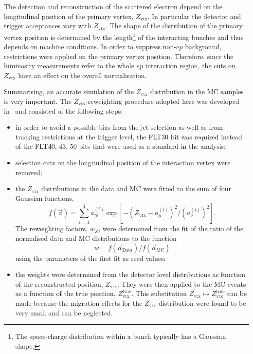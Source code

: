 The detection and reconstruction of the scattered electron depend on the longitudinal position of the primary vertex, $Z_\text{vtx}$. In particular the detector and trigger acceptances vary with $Z_\text{vtx}$. The shape of the distribution of the primary vertex position is determined by the length\footnote{The space-charge distribution within a bunch typically has a Gaussian shape.} of the interacting bunches and thus depends on machine conditions. In order to suppress non-$ep$ background, restrictions were applied on the primary vertex position. Therefore, since the luminosity measurements refer to the whole $ep$ interaction region, the cuts on $Z_\text{vtx}$ have an effect on the overall normalisation. 

Summarising, an accurate simulation of the $Z_\text{vtx}$ distribution in the MC samples is very important. The $Z_\text{vtx}$-reweighting procedure adopted here was developed in~\cite{thesis:behr:2010} and consisted of the following steps:
\begin{itemize}
 \item in order to avoid a possible bias from the jet selection as well as from tracking restrictions at the trigger level, the FLT30 bit was required instead of the FLT40, 43, 50 bits that were used as a standard in the analysis;
 \item selection cuts on the longitudinal position of the interaction vertex were removed;
 \item the $Z_\text{vtx}$ distributions in the data and MC were fitted to the sum of four Gaussian functions, 
\begin{equation}
f\left(\vec a\right)=\sum_{i=1}^4{a_N^{\left(i\right)}\exp{\left[-\left(Z_\text{vtx}-a_{\mu}^{\left(i\right)}\right)^2/\left(a_\sigma^{\left(i\right)}\right)^2\right]}}.
\label{eq:fourgauss}
\end{equation}
 The reweighting factors, $w_{Z}$, were determined from the fit of the ratio of the normalised data and MC distributions to the function 
\begin{equation}
w=f\left(\vec a_{\mathrm{Data}}\right)/f\left(\vec a_{\mathrm{MC}}\right)
\label{eq:zvtxweght}
\end{equation}
 using the parameters of the first fit as seed values;
 \item the weights were determined from the detector level distributions as function of the reconstructed position, $Z_\text{vtx}$. They were then applied to the MC events as a function of the true position, $Z_\text{vtx}^\text{true}$. This substitution $Z_\text{vtx} \mapsto Z_\text{vtx}^\text{true}$ can be made because the migration effects for the $Z_\text{vtx}$ distribution were found to be very small and can be neglected.
\end{itemize}

